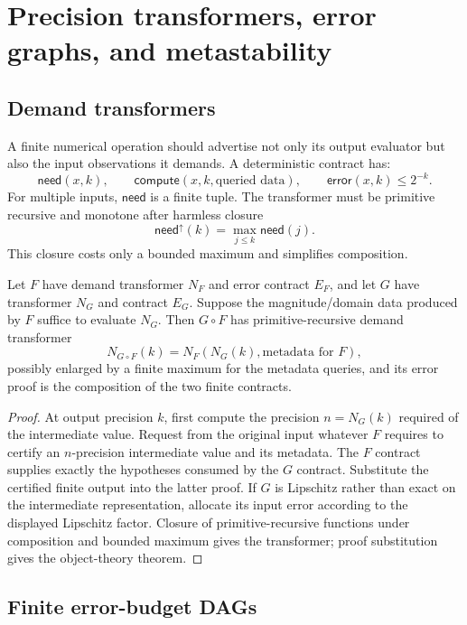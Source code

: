 \section{Precision transformers, error graphs, and metastability}
\label{sec:precision}

\subsection{Demand transformers}

A finite numerical operation should advertise not only its output evaluator but also the input observations it demands.  A deterministic contract has:
\[
  \mathsf{need}(x,k),\qquad
  \mathsf{compute}(x,k,\text{queried data}),\qquad
  \mathsf{error}(x,k)\le2^{-k}.
\]
For multiple inputs, $\mathsf{need}$ is a finite tuple.  The transformer must be primitive recursive and monotone after harmless closure
\[
 \mathsf{need}^{\uparrow}(k)=\max_{j\le k}\mathsf{need}(j).
\]
This closure costs only a bounded maximum and simplifies composition.

\begin{theorem}
\label{thm:precision-compose}
Let $F$ have demand transformer $N_F$ and error contract $E_F$, and let $G$ have transformer $N_G$ and contract $E_G$.  Suppose the magnitude/domain data produced by $F$ suffice to evaluate $N_G$.  Then $G\circ F$ has primitive-recursive demand transformer
\[
  N_{G\circ F}(k)=N_F(N_G(k),\text{metadata for }F),
\]
possibly enlarged by a finite maximum for the metadata queries, and its error proof is the composition of the two finite contracts.
\end{theorem}

\begin{proof}
At output precision $k$, first compute the precision $n=N_G(k)$ required of the intermediate value.  Request from the original input whatever $F$ requires to certify an $n$-precision intermediate value and its metadata.  The $F$ contract supplies exactly the hypotheses consumed by the $G$ contract.  Substitute the certified finite output into the latter proof.  If $G$ is Lipschitz rather than exact on the intermediate representation, allocate its input error according to the displayed Lipschitz factor.  Closure of primitive-recursive functions under composition and bounded maximum gives the transformer; proof substitution gives the object-theory theorem.
\end{proof}

\subsection{Finite error-budget DAGs}

